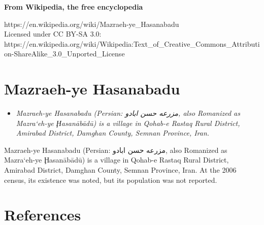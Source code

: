 \textbf{From Wikipedia, the free encyclopedia}

https://en.wikipedia.org/wiki/Mazraeh-ye\_Hasanabadu\\
Licensed under CC BY-SA 3.0:\\
https://en.wikipedia.org/wiki/Wikipedia:Text\_of\_Creative\_Commons\_Attribution-ShareAlike\_3.0\_Unported\_License

\section{Mazraeh-ye Hasanabadu}\label{mazraeh-ye-hasanabadu}

\begin{itemize}
\item
  \emph{Mazraeh-ye Hasanabadu (Persian: مزرعه حسن ابادو‎, also Romanized
  as Mazra`eh-ye Ḩasanābādū) is a village in Qohab-e Rastaq Rural
  District, Amirabad District, Damghan County, Semnan Province, Iran.}
\end{itemize}

Mazraeh-ye Hasanabadu (Persian: مزرعه حسن ابادو‎, also Romanized as
Mazra`eh-ye Ḩasanābādū) is a village in Qohab-e Rastaq Rural District,
Amirabad District, Damghan County, Semnan Province, Iran. At the 2006
census, its existence was noted, but its population was not reported.

\section{References}\label{references}
